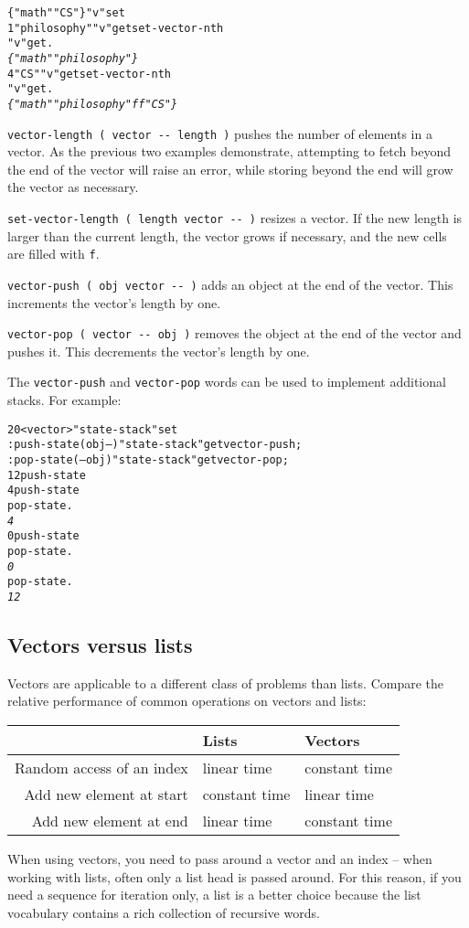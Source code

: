 \documentclass[english]{article}
\providecommand{\tabularnewline}{\\}
\begin{document}
\begin{alltt}
\{ "math" "CS" \} "v" set
1 "philosophy" "v" get set-vector-nth
"v" get .
\emph{\{ "math" "philosophy" \}}
4 "CS" "v" get set-vector-nth
"v" get .
\emph{\{ "math" "philosophy" f f "CS" \}}
\end{alltt}
\texttt{vector-length ( vector -{}- length )} pushes the number of
elements in a vector. As the previous two examples demonstrate, attempting
to fetch beyond the end of the vector will raise an error, while storing
beyond the end will grow the vector as necessary.

\texttt{set-vector-length ( length vector -{}- )} resizes a vector.
If the new length is larger than the current length, the vector grows
if necessary, and the new cells are filled with \texttt{f}.

\texttt{vector-push ( obj vector -{}- )} adds an object at the end
of the vector. This increments the vector's length by one.

\texttt{vector-pop ( vector -{}- obj )} removes the object at the
end of the vector and pushes it. This decrements the vector's length
by one.

The \texttt{vector-push} and \texttt{vector-pop} words can be used to implement additional stacks. For example:

\begin{alltt}
20 <vector> "state-stack" set
: push-state ( obj -- ) "state-stack" get vector-push ;
: pop-state ( -- obj ) "state-stack" get vector-pop ;
12 push-state
4 push-state
pop-state .
\emph{4}
0 push-state
pop-state .
\emph{0}
pop-state .
\emph{12}
\end{alltt}

\subsection{Vectors versus lists}

Vectors are applicable to a different class of problems than lists.
Compare the relative performance of common operations on vectors and
lists:

\begin{tabular}{|r|l|l|}
\hline 
&
Lists&
Vectors\tabularnewline
\hline
\hline 
Random access of an index&
linear time&
constant time\tabularnewline
\hline 
Add new element at start&
constant time&
linear time\tabularnewline
\hline 
Add new element at end&
linear time&
constant time\tabularnewline
\hline
\end{tabular}

When using vectors, you need to pass around a vector and an index
-- when working with lists, often only a list head is passed around.
For this reason, if you need a sequence for iteration only, a list
is a better choice because the list vocabulary contains a rich collection
of recursive words.
\end{document}
